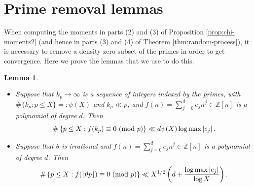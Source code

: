 \documentclass[12pt, a4paper]{amsart}
\newtheorem{lemma}{Lemma}
\theoremstyle{remark}
\newcommand{\Z}{\ensuremath{\mathbb{Z}}}
\newcommand{\abs}[1]{\left|#1\right|}
\newcommand{\floor}[1]{\left\lfloor#1\right\rfloor}
\renewcommand{\mod}[1]{{\ifmmode\text{\rm\ (mod~$#1$)}\else\discretionary{}{}{\hbox{ }}\rm(mod~$#1$)\fi}}
\begin{document}
\section{Prime removal lemmas}\label{primeRemSect}
When computing the moments in parts (2) and (3) of Proposition
\ref{prop:chi-moments2} (and hence in parts (3) and (4) of Theorem \ref{thm:random-process}),
it is necessary to remove a density zero subset of the primes in order
to get convergence. Here we prove the lemmas that we use to do this.
\begin{lemma}\label{lemma:fpalpha}\phantom{blah}
   \begin{itemize} \item[(1)]  Suppose that 
    $k_p\to\infty$ is a sequence of integers indexed by the primes,
    with $\#\{k_p : p\leq X\} =: \psi(X)$ and $k_p\ll p$, and $f(n) = \sum_{j=0}^d e_j n^j \in
    \Z[n]$ is a polynomial of degree $d$. Then
    \[
        \#\left\{p\leq X: f(k_p) \equiv 0 \mod p \right\} 
            \ll d\psi(X)\log\max\abs{e_j}.
    \]
    
    \item[(2)] Suppose that $\theta$ is irrational and $f(n) = \sum_{j=0}^d e_j n^j \in
    \Z[n]$ is a polynomial of degree $d$. Then
    \[
        \#\left\{p\leq X : f(\floor{\theta p}) \equiv 0 \mod p \right\} \ll
        X^{1/2}\left(d + \frac{\log\max\abs{e_j}}{\log X}\right).
    \]
    \end{itemize}
\end{lemma}
\end{document}
